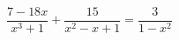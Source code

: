 \begin{ex}[type=equation]
	\begin{condition}
		$\dfrac{7-18x}{x^3 + 1}+\dfrac{15}{x^2 - x + 1} = \dfrac{3}{1 - x^2}$
	\end{condition}
\end{ex}